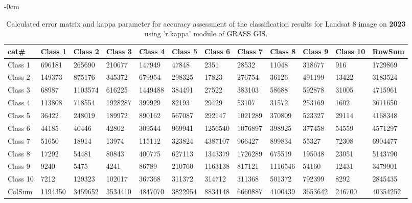 \documentclass[analytics,article,submit,pdftex,moreauthors]{Definitions/mdpi}
\begin{document}
\begin{table}[H] 
\footnotesize
    \centering
    \begin{adjustwidth}{-\extralength}{0cm}
    \caption{Calculated error matrix and kappa parameter for accuracy assessment of the classification results for Landsat 8 image on \textbf{2023} using 'r.kappa' module of GRASS GIS.\label{tab03}}
 	\begin{tabularx}{\fulllength}{|l|l|l|l|l|l|l|l|l|l|l|l|}
    \toprule
        \textbf{cat\#} & \textbf{Class 1} & \textbf{Class 2} & \textbf{Class 3} & \textbf{Class 4} & \textbf{Class 5} & \textbf{Class 6} & \textbf{Class 7} & \textbf{Class 8} & \textbf{Class 9} & \textbf{Class 10} & \textbf{RowSum} \\ \hline
        Class 1 & \cellcolor{green!10}696181 & 265690 & 210677 & 147949 & 47848 & 2351 & 28532 & 11048 & 318677 & 916 & 1729869 \\ \hline
        Class 2 & 149373 & \cellcolor{green!10}875176 & 345372 & 679954 & 298325 & 17823 & 276754 & 36126 & 491199 & 13422 & 3183524 \\ \hline
        Class 3 & 68987 & 1103574 & \cellcolor{green!10}616225 & 1449488 & 384491 & 27522 & 383103 & 58688 & 592878 & 31005 & 4715961 \\ \hline
        Class 4 & 113808 & 718554 & 1928287 & \cellcolor{green!10}399929 & 82193 & 29429 & 53107 & 31572 & 253169 & 1602 & 3611650 \\ \hline
        Class 5 & 36422 & 248019 & 189972 & 890162 & \cellcolor{green!10}567087 & 292147 & 1021289 & 370809 & 523327 & 29114 & 4168348 \\ \hline
        Class 6 & 44185 & 40446 & 42802 & 309544 & 969941 & \cellcolor{green!10}1256540 & 1076897 & 398925 & 377458 & 54559 & 4571297 \\ \hline
        Class 7 & 51650 & 18914 & 13974 & 115112 & 323824 & 4387107 & \cellcolor{green!10}966427 & 899834 & 55327 & 72308 & 6904477 \\ \hline
        Class 8 & 17292 & 54481 & 80843 & 400775 & 627113 & 1343379 & 1726289 & \cellcolor{green!10}675519 & 195048 & 23051 & 5143790 \\ \hline
        Class 9 & 9240 & 5475 & 4241 & 86789 & 210760 & 1163138 & 817121 & 1116546 & \cellcolor{green!10}54160 & 12431 & 3479901 \\ \hline
        Class 10 & 7212 & 129323 & 102017 & 367368 & 311372 & 314712 & 311368 & 501372 & 792399 & \cellcolor{green!10}8292 & 2845435 \\ \hline
        ColSum & 1194350 & 3459652 & 3534410 & 4847070 & 3822954 & 8834148 & 6660887 & 4100439 & 3653642 & 246700 & \cellcolor{green!10}40354252 \\ \hline
     \bottomrule
    \end{tabularx}
    \end{adjustwidth}
\end{table}
\end{document}
